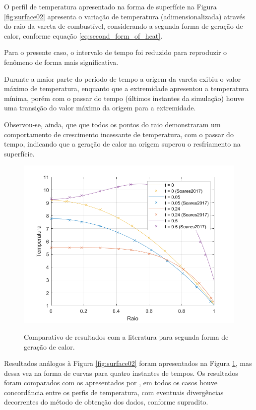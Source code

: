 O perfil de temperatura apresentado na forma de superfície na Figura \ref{fig:surface02} apresenta o variação de temperatura (adimensionalizada) através do raio da vareta de combustível, considerando a segunda forma de geração de calor, conforme equação \ref{eq:second_form_of_heat}.

Para o presente caso, o intervalo de tempo foi reduzido para reproduzir o fenômeno de forma mais significativa.

Durante a maior parte do período de tempo a origem da vareta exibiu o valor máximo de temperatura, enquanto que a extremidade apresentou a temperatura mínima, porém com o passar do tempo (últimos instantes da simulação) houve uma transição do valor máximo da origem para a extremidade.

Observou-se, ainda, que que todos os pontos do raio demonstraram um comportamento de crescimento incessante de temperatura, com o passar do tempo, indicando que a geração de calor na origem superou o resfriamento na superfície.

\begin{figure}[H]
    \centering
    \caption{Comparativo de resultados com a literatura para segunda forma de geração de calor.}
    \includegraphics[scale=0.5]{figures/results/Fig06.png}
    \label{fig:profile02}
\end{figure}

Resultados análogos à Figura \ref{fig:surface02} foram apresentados na Figura \ref{fig:profile02}, mas dessa vez na forma de curvas para quatro instantes de tempos. Os resultados foram comparados com os apresentados por \citet{soares2017}, em todos os casos houve concordância entre os perfis de temperatura, com eventuais divergências decorrentes do método de obtenção dos dados, conforme supradito.

